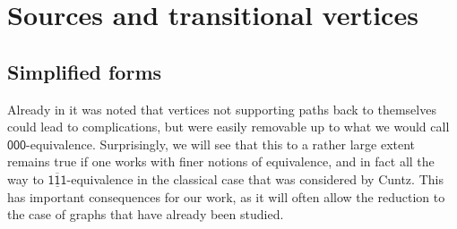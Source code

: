 \documentclass[12pt]{amsbook}%
\theoremstyle{defin}
\theoremstyle{remark}
\numberwithin{equation}{chapter}
\numberwithin{theor}{section}
\newcommand{\xyz}[1]{\mbox{$\mathsf{#1}$}}
\newcommand{\xyzrel}[1]{\mbox{$\overline{\underline{\mathsf{ #1}}}$}}
\begin{document}
\chapter{Sources and transitional vertices}
\section{Simplified forms}\label{standardforms}



Already in \cite{jc:cctmc2} it was noted that vertices not supporting paths back to themselves could lead to complications, but were easily removable up to what we would call \xyz{000}-equivalence. Surprisingly, we will see that this to a rather large extent remains true if one works with finer notions of equivalence, and in fact all the way to \xyzrel{111}-equivalence in the classical case that was considered by Cuntz. This has important consequences for our work, as it will often allow the reduction to the case of graphs that have already been studied.
\end{document}
